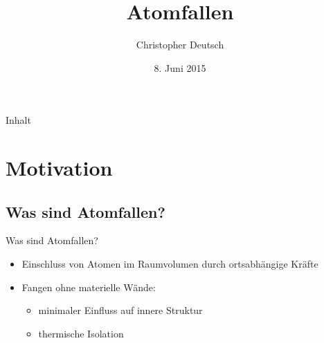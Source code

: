 \documentclass[12pt,xcolor=dvipsnames,professionalfonts]{beamer}
\author[Christopher Deutsch]
{Christopher Deutsch}
\title
{Atomfallen}
\subtitle
{}
\institute[]
{Rheinische Friedrich-Wilhelms-Universität Bonn \\
Proseminar Präsentationstechnik SS15}
\date{8. Juni 2015}
\begin{document}
\maketitle

\begin{frame}{Inhalt}
	\tableofcontents
\end{frame}


\section{Motivation}

\subsection{Was sind Atomfallen?}
\begin{frame}{Was sind Atomfallen?}
	\begin{itemize}
		\setlength\itemsep{1em}
		\item Einschluss von Atomen im Raumvolumen durch ortsabhängige Kräfte
		
		\item Fangen ohne materielle Wände:
		\begin{itemize}
			\item minimaler Einfluss auf innere Struktur
			
			\item thermische Isolation
		\end{itemize}

	\end{itemize}
\end{frame}
\end{document}

